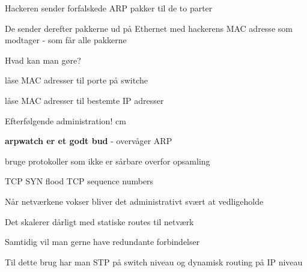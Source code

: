 \documentclass[Screen16to9,17pt]{foils}
\begin{document}


\begin{list1}
\item Hackeren sender forfalskede ARP pakker til de to parter
\item De sender derefter pakkerne ud på Ethernet med hackerens MAC
  adresse som modtager - som får alle pakkerne
\end{list1}


\begin{list1}
\item Hvad kan man gøre?
\item låse MAC adresser til porte på switche
\item låse MAC adresser til bestemte IP adresser
\item Efterfølgende administration!
 cm
\item {\bfseries arpwatch er et godt bud} - overvåger ARP
\item bruge protokoller som ikke er sårbare overfor opsamling
\end{list1}




TCP SYN flood
TCP sequence numbers




\begin{list1}
\item Når netværkene vokser bliver det administrativt svært at vedligeholde
\item Det skalerer dårligt med statiske routes til netværk
\item Samtidig vil man gerne have redundante forbindelser
\item Til dette brug har man STP på switch niveau og dynamisk routing på IP niveau
\end{list1}




\end{document}
